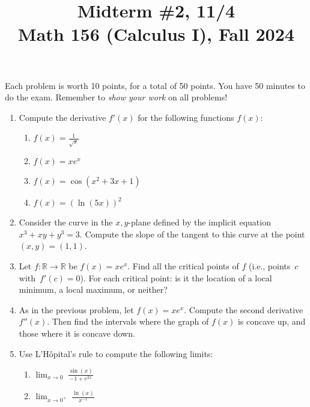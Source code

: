 \documentclass[11pt]{article}
\title{Midterm \#2, 11/4 \\ Math 156 (Calculus I), Fall 2024}
\date{}
\begin{document}
\maketitle

\thispagestyle{empty}

\vspace{-1cm}

Each problem is worth 10 points, for a total of 50 points. You have 50 minutes to do the exam. Remember to \emph{show your work} on all problems!

\begin{enumerate}
\item Compute the derivative $f'(x)$ for the following functions $f(x)$:
\begin{enumerate}
\item $f(x) = \frac{1}{\sqrt{x}}$
\item $f(x) = x e^{x}$
\item $f(x) = \cos(x^2+3x+1)$
\item $f(x) = (\ln(5x))^2$
\end{enumerate}

\item Consider the curve in the $x,y$-plane defined by the implicit equation $x^3 + xy + y^3 = 3$. Compute the slope of the tangent to this curve at the point $(x,y) = (1,1)$.

\item Let $f\colon \mathbb{R}\to \mathbb{R}$ be $f(x) = x e^{x}$. Find all the critical points of $f$ (i.e., points~$c$ with~$f'(c)=0$). For each critical point: is it the location of a local minimum, a local maximum, or neither?

\item As in the previous problem, let $f(x) = x e^{x}$. Compute the second derivative $f''(x)$. Then find the intervals where the graph of $f(x)$ is concave up, and those where it is concave down.

\item Use L'H\^{o}pital's rule to compute the following limits:
\begin{enumerate}
\item $\displaystyle \lim_{x \to 0} \; \frac{\sin(x)}{-1+e^{2x}}$ \\[0.25em]
\item $\displaystyle \lim_{x \to 0^+} \; \frac{\ln(x)}{x^{-1}}$
\end{enumerate}
\end{enumerate}
\end{document}
